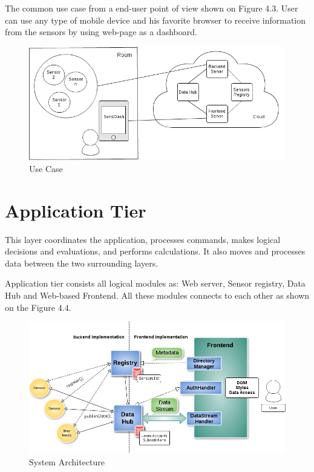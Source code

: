     The common use case from a end-user point of view shown on Figure 4.3. User can use any type of mobile device and his favorite browser to receive information from the sensors by using web-page as a dashboard.

        \begin{figure}[!ht]
        \centering
        \includegraphics[scale=0.6]{images/User_Case.png}   
        \caption[Use Case]{Use Case}
        \label{img:structure}                           
        \end{figure}

\section{Application Tier}
  This layer coordinates the application, processes commands, makes logical decisions and evaluations, and performs calculations. It also moves and processes data between the two surrounding layers.

  Application tier consists all logical modules as: Web server, Sensor registry, Data Hub and Web-based Frontend. All these modules connects to each other as shown on the Figure 4.4. 
    \begin{figure}[!ht]
    \centering
    \includegraphics[scale=0.6]{images/Structure.png}   
    \caption[System Architecture]{System Architecture}
    \label{img:structure}                           
    \end{figure}


